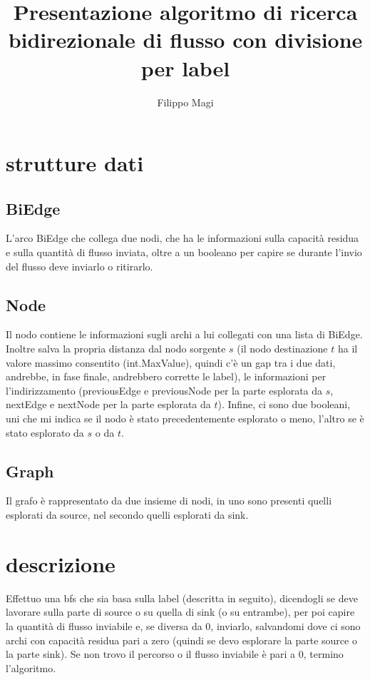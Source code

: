 \documentclass{article}
\title{Presentazione algoritmo di ricerca bidirezionale di flusso con divisione per label}
\author{Filippo Magi }
\begin{document}
\maketitle

\section{strutture dati}

\subsection{BiEdge}

L'arco BiEdge che collega due nodi, che ha le informazioni sulla capacità residua e sulla quantità di flusso inviata, oltre a un booleano per capire se durante l'invio del flusso deve inviarlo o ritirarlo.

\subsection{Node}

Il nodo contiene le informazioni sugli archi a lui collegati con una lista di BiEdge.
Inoltre salva la propria distanza dal nodo sorgente $s$ (il nodo destinazione $t$ ha il valore massimo consentito (int.MaxValue), quindi c'è un gap tra i due dati, andrebbe, in fase finale, andrebbero corrette le label), le informazioni per l'indirizzamento (previousEdge e previousNode per la parte esplorata da $s$, nextEdge e nextNode per la parte esplorata da $t$).
Infine, ci sono due booleani, uni che mi indica se il nodo è stato precedentemente esplorato o meno, l'altro se è stato esplorato da $s$ o da $t$.

\subsection{Graph}

Il grafo è rappresentato da due insieme di nodi, in uno sono presenti quelli esplorati da source, nel secondo quelli esplorati da sink.

\section{descrizione}

Effettuo una bfs che sia basa sulla label (descritta in seguito), dicendogli se deve lavorare sulla parte di source o su quella di sink (o su entrambe), per poi capire la quantità di flusso inviabile e, se diversa da 0, inviarlo, salvandomi dove ci sono archi con capacità residua pari a zero (quindi se devo esplorare la parte source o la parte sink).
Se non trovo il percorso o il flusso inviabile è pari a 0, termino l'algoritmo.
\end{document}
